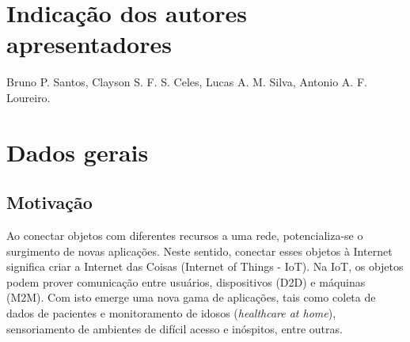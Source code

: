 \documentclass{SBCbookchapter}
\begin{document}


\section{Indicação dos autores apresentadores}
Bruno P. Santos, Clayson S. F. S. Celes, Lucas A. M. Silva, Antonio A. F. 
Loureiro.

\section{Dados gerais}

\subsection{Motivação}

Ao conectar objetos com diferentes recursos a uma rede, potencializa-se o 
surgimento de novas aplicações. Neste sentido, conectar esses objetos à 
Internet significa criar a Internet das Coisas (Internet of Things - IoT). Na 
IoT, os objetos podem prover comunicação entre usuários, dispositivos (D2D) e 
máquinas (M2M). Com isto emerge uma nova gama de aplicações, tais como coleta de 
dados de pacientes e monitoramento de idosos (\textit{healthcare at home}), 
sensoriamento de ambientes de difícil acesso e inóspitos, entre outras.
\end{document}
